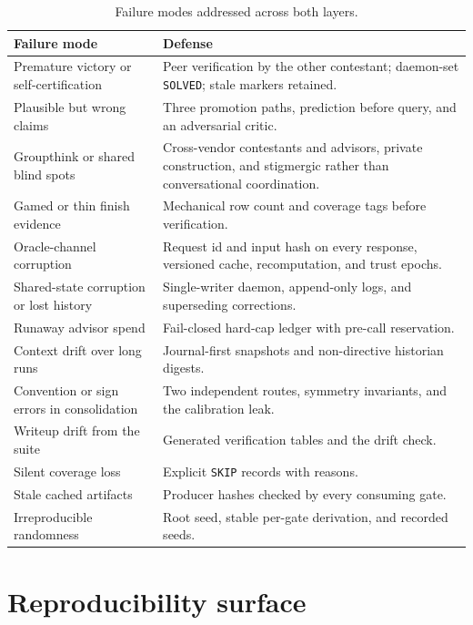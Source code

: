 \documentclass[11pt]{article}
\newcommand{\code}[1]{\texttt{#1}}
\begin{document}
\begin{table}[htbp]
\centering
\footnotesize
\caption{Failure modes addressed across both layers.}
\label{tab:failures}
\begin{tabularx}{\textwidth}{@{}p{}Y@{}}
\toprule
Failure mode & Defense \\
\midrule
Premature victory or self-certification &
Peer verification by the other contestant; daemon-set \code{SOLVED}; stale
markers retained. \\
Plausible but wrong claims &
Three promotion paths, prediction before query, and an adversarial critic. \\
Groupthink or shared blind spots &
Cross-vendor contestants and advisors, private construction, and stigmergic
rather than conversational coordination. \\
Gamed or thin finish evidence &
Mechanical row count and coverage tags before verification. \\
Oracle-channel corruption &
Request id and input hash on every response, versioned cache, recomputation,
and trust epochs. \\
Shared-state corruption or lost history &
Single-writer daemon, append-only logs, and superseding corrections. \\
Runaway advisor spend &
Fail-closed hard-cap ledger with pre-call reservation. \\
Context drift over long runs &
Journal-first snapshots and non-directive historian digests. \\
Convention or sign errors in consolidation &
Two independent routes, symmetry invariants, and the calibration leak. \\
Writeup drift from the suite &
Generated verification tables and the drift check. \\
Silent coverage loss &
Explicit \code{SKIP} records with reasons. \\
Stale cached artifacts &
Producer hashes checked by every consuming gate. \\
Irreproducible randomness &
Root seed, stable per-gate derivation, and recorded seeds. \\
\bottomrule
\end{tabularx}
\end{table}

\section{Reproducibility surface}
\end{document}
